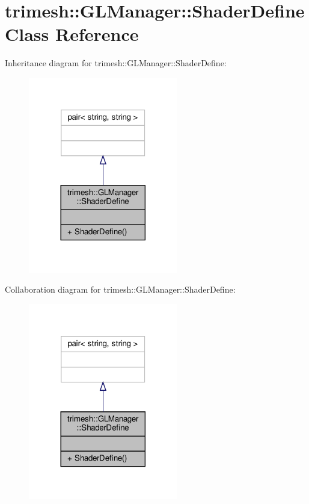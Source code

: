 \hypertarget{classtrimesh_1_1GLManager_1_1ShaderDefine}{}\section{trimesh\+:\+:G\+L\+Manager\+:\+:Shader\+Define Class Reference}
\label{classtrimesh_1_1GLManager_1_1ShaderDefine}


Inheritance diagram for trimesh\+:\+:G\+L\+Manager\+:\+:Shader\+Define\+:\nopagebreak
\begin{figure}[H]
\begin{center}
\leavevmode
\includegraphics[width=185pt]{d5/d53/classtrimesh_1_1GLManager_1_1ShaderDefine__inherit__graph}
\end{center}
\end{figure}


Collaboration diagram for trimesh\+:\+:G\+L\+Manager\+:\+:Shader\+Define\+:\nopagebreak
\begin{figure}[H]
\begin{center}
\leavevmode
\includegraphics[width=185pt]{d4/db6/classtrimesh_1_1GLManager_1_1ShaderDefine__coll__graph}
\end{center}
\end{figure}
